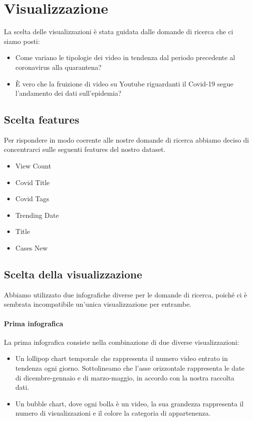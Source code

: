 \documentclass[10pt, a4paper,openany]{article}
\begin{document}
\section*{Visualizzazione}

La scelta delle visualizzazioni è stata guidata dalle domande di ricerca che ci siamo posti: 
\begin{itemize}
	\item Come variano le tipologie dei video in tendenza dal periodo precedente al coronavirus alla quarantena?
	\item È vero che la fruizione di video su Youtube riguardanti il Covid-19 segue l'andamento dei dati sull'epidemia?
\end{itemize}

\subsection*{Scelta features}
Per rispondere in modo coerente alle nostre domande di ricerca abbiamo deciso di concentrarci sulle seguenti features del nostro dataset.
\begin{itemize}
	\item View Count
	\item Covid Title
	\item Covid Tags
	\item Trending Date
	\item Title
	\item Cases New
\end{itemize}

\subsection*{Scelta della visualizzazione}

Abbiamo utilizzato due infografiche diverse per le domande di ricerca, poiché ci è sembrata incompatibile un'unica visualizzazione per entrambe.


\paragraph{Prima infografica} La prima infografica consiste nella combinazione di due diverse visualizzazioni:
\begin{itemize}
	\item Un lollipop chart temporale che rappresenta il numero video entrato in tendenza ogni giorno. Sottolineamo che l'asse orizzontale rappresenta le date di dicembre-gennaio e di marzo-maggio, in accordo con la nostra raccolta dati.
	\item Un bubble chart, dove ogni bolla è un video, la sua grandezza rappresenta il numero di visualizzazioni e il colore la categoria di appartenenza.
\end{itemize}
\end{document}
